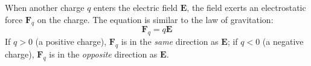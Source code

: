 %
%        

When another charge $q$ enters the electric field $\bm E$, the field exerts
an electrostatic force $\bm F_q$ on the charge. The equation is similar to
the law of gravitation:
\begin{equation}
  \boxed{
    \bm F_q=q\bm E
  }
\end{equation}
If $q>0$ (a positive charge), $\bm F_q$ is in the \emph{same} direction as
$\bm E$; if $q<0$ (a negative charge), $\bm F_q$ is in the
\emph{opposite} direction as $\bm E$.


